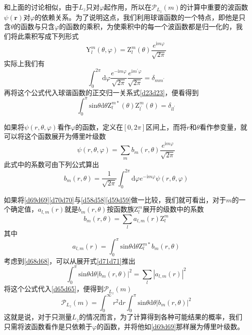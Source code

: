 \documentclass[]{article}
\begin{document}
和上面的讨论相似，由于$L_z$只对$\varphi$起作用，所以在$\mathscr{P}_{L_z}(m)$的计算中重要的波函数$\psi(\boldsymbol{r})$对$\varphi$的依赖关系。为了说明这点，我们利用球谐函数的一个特点，即他是只含$\theta$的函数与只含$\varphi$的函数的乘积，为使乘积中的每一个波函数都是归一化的，我们将此乘积写成下列形式
\begin{equation}
	\mathrm{Y}_l^m(\theta,\varphi)=\mathrm{Z}_l^m(\theta)\dfrac{e^{\mathrm{i}m\varphi}}{\sqrt{2\pi}}
\end{equation}
实际上我们有
\begin{equation}
	\int_{0}^{2\pi}\mathrm{d}\varphi\dfrac{e^{-\mathrm{i}m\varphi}}{\sqrt{2\pi}}\dfrac{e^{\mathrm{i}m^\prime\varphi}}{\sqrt{2\pi}}=\delta_{mm^\prime}
\end{equation}
再将这个公式代入球谐函数的正交归一关系式\eqref{d23d23}，便看得到
\begin{equation}
	\int_{0}^{\pi}\mathrm{sin}\theta\mathrm{d}\theta\mathrm{Z}_l^{m*}(\theta)\mathrm{Z}_{l^\prime}^m(\theta)=\delta_{ll^\prime}
	\label{d68d68}
\end{equation}

如果将$\psi(r,\theta,\varphi)$看作$\varphi$的函数，定义在$[0,2\pi]$区间上，而将$r$和$\theta$看作参变量，就可以将这个函数展开为傅里叶级数
\begin{equation}
	\psi(r,\theta,\varphi)=\sum\limits_{m}b_m(r,\theta)\dfrac{e^{\mathrm{i}m\varphi}}{\sqrt{2\pi}}
	\label{d69d69}
\end{equation}
此式中的系数可由下列公式算出
\begin{equation}
	b_m(r,\theta)=\dfrac{1}{\sqrt{2\pi}}\int_{0}^{2\pi}\mathrm{d}\varphi e^{-\mathrm{i}m\varphi}\psi(r,\theta,\varphi)
	\label{d70d70}
\end{equation}

如果将\eqref{d69d69}\eqref{d70d70}与\eqref{d58d58}\eqref{d59d59}做一比较，我们就可看出，对于$m$的一个确定值，$a_{l,m}(r)$就是$b_m(r,\theta)$按函数族$\mathrm{Z}_l^m$展开的级数中的系数
\begin{equation}
	b_m(r,\theta)=\sum\limits_{l}a_{l,m}(r)\mathrm{Z}_l^m
	\label{d71d71}
\end{equation}
其中
\begin{equation}
	a_{l,m}(r)=\int_{0}^{\pi}\mathrm{sin}\theta\mathrm{d}\theta\mathrm{Z}_l^{m*}b_m(r,\theta)
\end{equation}
考虑到\eqref{d68d68}，可以从展开式\eqref{d71d71}推出
\begin{equation}
	\int_{0}^{\pi}\mathrm{sin}\theta\mathrm{d}\theta|b_m(r,\theta)|^2=\sum\limits_{l}|a_{l,m}(r)|^2
\end{equation}
将这个公式代入\eqref{d65d65}，便得到$\mathscr{P}_{L_z}(m)$
\begin{equation}
	\mathscr{P}_{L_z}(m)=\int_{0}^{\infty}r^2\mathrm{d}r\int_{0}^{\pi}\mathrm{sin}\theta\mathrm{d}\theta|b_m(r,\theta)|^2
	\label{d74d74}
\end{equation}
这就是说，对于只测量$L_z$的情况而言，为了计算得到各种可能结果的概率，我们只需将波函数看作是只依赖于$\varphi$的函数，并将他如\eqref{d69d69}那样展为傅里叶级数。
\end{document}
